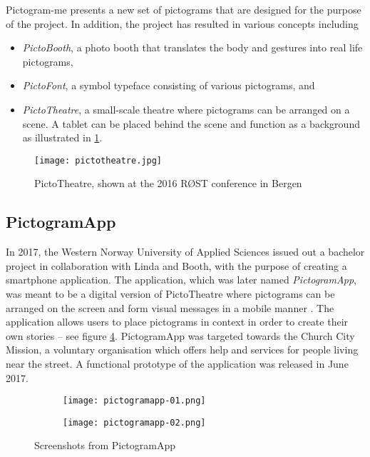 Pictogram-me presents a new set of pictograms that are designed for the purpose of the project. In addition, the project has resulted in various concepts including

\begin{itemize}
    \item \emph{PictoBooth}, a photo booth that translates the body and gestures into real life pictograms,
    \item \emph{PictoFont}, a symbol typeface consisting of various pictograms, and
    \item \emph{PictoTheatre}, a small-scale theatre where pictograms can be arranged on a scene. A tablet can be placed behind the scene and function as a background as illustrated in \ref{fig:pictotheatre}.
\end{itemize}

\begin{figure}[h]
    \centering
    \texttt{[image: pictotheatre.jpg]}
    \caption{PictoTheatre, shown at the 2016 RØST conference in Bergen}
    \label{fig:pictotheatre}
\end{figure}

\subsection{PictogramApp}

In 2017, the Western Norway University of Applied Sciences issued out a bachelor project in collaboration with Linda and Booth, with the purpose of creating a smartphone application. The application, which was later named \emph{PictogramApp}, was meant to be a digital version of PictoTheatre where pictograms can be arranged on the screen and form visual messages in a mobile manner \parencite{fure2017}. The application allows users to place pictograms in context in order to create their own stories -- see figure \ref{fig:pictogramapp}. PictogramApp was targeted towards the Church City Mission, a voluntary organisation which offers help and services for people living near the street. A functional prototype of the application was released in June 2017.

\begin{figure}[h]
    \centering
    \begin{subfigure}{0.3\textwidth}
        \centering
        \texttt{[image: pictogramapp-01.png]}
        \label{fig:pictogramapp-list}
    \end{subfigure}
    \hspace{0.05\textwidth}
    \begin{subfigure}{0.3\textwidth}
        \centering
        \texttt{[image: pictogramapp-02.png]}
        \label{fig:pictogramapp-scene}
    \end{subfigure}
    \caption{Screenshots from PictogramApp}
    \label{fig:pictogramapp}
\end{figure}

